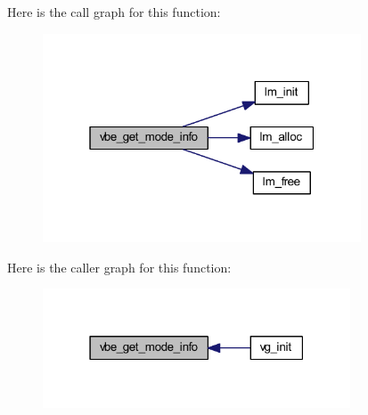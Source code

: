 Here is the call graph for this function\+:\nopagebreak
\begin{figure}[H]
\begin{center}
\leavevmode
\includegraphics[width=268pt]{group__vbe_ga4ef3234e41f2050bc094a22049b69e45_cgraph}
\end{center}
\end{figure}




Here is the caller graph for this function\+:\nopagebreak
\begin{figure}[H]
\begin{center}
\leavevmode
\includegraphics[width=259pt]{group__vbe_ga4ef3234e41f2050bc094a22049b69e45_icgraph}
\end{center}
\end{figure}


